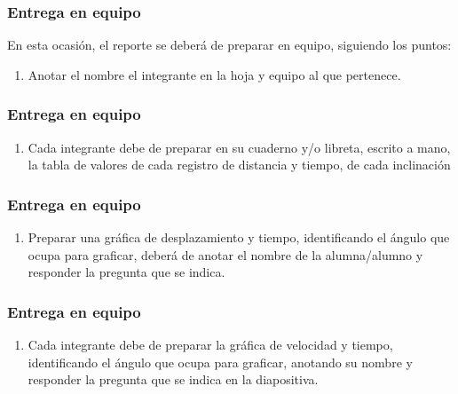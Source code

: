 \documentclass[14pt]{beamer}
\begin{document}
\begin{frame}
\frametitle{Entrega en equipo}
En esta ocasión, el reporte se deberá de preparar en equipo, siguiendo los puntos:
\begin{enumerate}[<+->]
\item Anotar el nombre el integrante en la hoja y equipo al que pertenece.
\seti
\end{enumerate}
\end{frame}
\begin{frame}
\frametitle{Entrega en equipo}
\begin{enumerate}[<+->]
\conti
\item Cada integrante debe de preparar en su cuaderno y/o libreta, escrito a mano, la tabla de valores de cada registro de distancia y tiempo, de cada inclinación
\seti
\end{enumerate}
\end{frame}
\begin{frame}
\frametitle{Entrega en equipo}
\begin{enumerate}[<+->]
\conti
\item Preparar una gráfica de desplazamiento y tiempo, identificando el ángulo que ocupa para graficar, deberá de  anotar el nombre de la alumna/alumno y responder la pregunta que se indica.
\seti
\end{enumerate}
\end{frame}
\begin{frame}
\frametitle{Entrega en equipo}
\begin{enumerate}[<+->]
\conti
\item Cada integrante debe de preparar la gráfica de velocidad y tiempo, identificando el ángulo que ocupa para graficar, anotando su nombre y responder la pregunta que se indica en la diapositiva.
\end{enumerate}
\end{frame}
\end{document}
